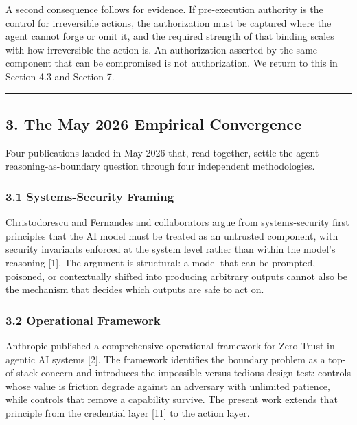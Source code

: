 \documentclass[
  11pt,
]{article}
\begin{document}
A second consequence follows for evidence. If pre-execution authority is
the control for irreversible actions, the authorization must be captured
where the agent cannot forge or omit it, and the required strength of
that binding scales with how irreversible the action is. An
authorization asserted by the same component that can be compromised is
not authorization. We return to this in Section 4.3 and Section 7.

\begin{center}\rule{0.5\linewidth}{0.5pt}\end{center}

\subsection{3. The May 2026 Empirical
Convergence}\label{the-may-2026-empirical-convergence}

Four publications landed in May 2026 that, read together, settle the
agent-reasoning-as-boundary question through four independent
methodologies.

\subsubsection{3.1 Systems-Security
Framing}\label{systems-security-framing}

Christodorescu and Fernandes and collaborators argue from
systems-security first principles that the AI model must be treated as
an untrusted component, with security invariants enforced at the system
level rather than within the model's reasoning {[}1{]}. The argument is
structural: a model that can be prompted, poisoned, or contextually
shifted into producing arbitrary outputs cannot also be the mechanism
that decides which outputs are safe to act on.

\subsubsection{3.2 Operational Framework}\label{operational-framework}

Anthropic published a comprehensive operational framework for Zero Trust
in agentic AI systems {[}2{]}. The framework identifies the boundary
problem as a top-of-stack concern and introduces the
impossible-versus-tedious design test: controls whose value is friction
degrade against an adversary with unlimited patience, while controls
that remove a capability survive. The present work extends that
principle from the credential layer {[}11{]} to the action layer.
\end{document}

